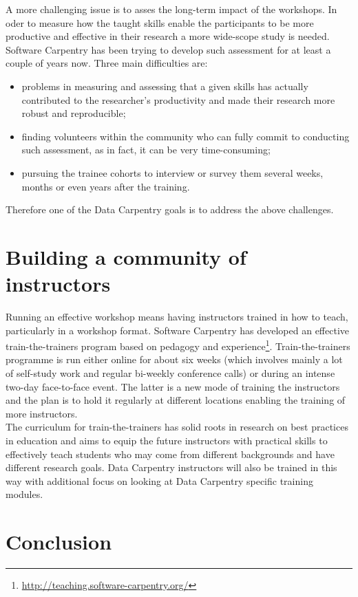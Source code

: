 \documentclass[15]{idcc}
\begin{document}
\begin{itemize}
A more challenging issue is to asses the long-term impact of the workshops. In oder to measure how the taught skills enable the participants to
be more productive and effective in their research a more wide-scope study is needed. Software Carpentry has been trying to develop such assessment
for at least a couple of years now. Three main difficulties are:
\begin{itemize}
\item problems in measuring and assessing that a given skills has actually contributed to the researcher's productivity and made their research more robust and reproducible;
\item finding volunteers within the community who can fully commit to conducting such assessment, as in fact, it can be very time-consuming;
\item pursuing the trainee cohorts to interview or survey them several weeks, months or even years after the training.
\end{itemize}

Therefore one of the Data Carpentry goals is to address the above challenges.


\section{Building a community of instructors}
Running an effective workshop means having instructors trained in how to teach, particularly in a workshop format. Software Carpentry has developed
 an effective train-the-trainers program based on pedagogy and experience\footnote{\url{http://teaching.software-carpentry.org/}}. Train-the-trainers programme is run either online for about six weeks
 (which involves mainly a lot of self-study work and regular bi-weekly conference calls) or during an intense two-day face-to-face event. The latter
is a new mode of training the instructors and the plan is to hold it regularly at different locations enabling the training of more instructors. \\

The curriculum for train-the-trainers has solid roots in research on best practices in education and aims to equip the future instructors with practical
skills to effectively teach students who may come from different backgrounds and have different research goals. Data Carpentry instructors will
also be trained in this way with additional focus on looking at Data Carpentry specific training modules.

\section{Conclusion}



\end{itemize}
\end{document}
